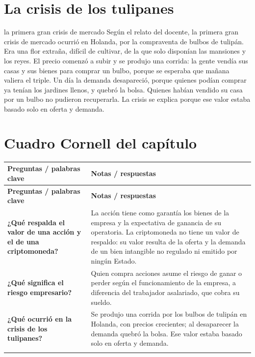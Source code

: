 \documentclass[12pt,oneside]{book}
\makeatletter
\newenvironment{cornell}{%
    \begin{longtable}{@{}>{\raggedright\arraybackslash}p{0.28\textwidth}>{\raggedright\arraybackslash}p{0.67\textwidth}@{}}
    \toprule
    \textbf{Preguntas / palabras clave} & \textbf{Notas / respuestas} \\
    \midrule
    \endfirsthead
    \toprule
    \textbf{Preguntas / palabras clave} & \textbf{Notas / respuestas} \\
    \midrule
    \endhead
}{%
    \end{longtable}
}
\newcommand{\cornellrow}[2]{\textbf{#1} & #2 \\[0.6em]}
\newcommand{\cornellresumen}[1]{%
    \midrule
    \multicolumn{2}{@{}p{\dimexpr0.95\textwidth+2\tabcolsep\relax}@{}}{\textbf{Resumen:} #1} \\
    \bottomrule
}
\makeatother
\begin{document}
\section{La crisis de los tulipanes}

\begin{example}{la primera gran crisis de mercado}
Según el relato del docente, la primera gran crisis de mercado ocurrió en Holanda, por la compraventa de bulbos de tulipán. Era una flor extraña, difícil de cultivar, de la que solo disponían las mansiones y los reyes. El precio comenzó a subir y se produjo una corrida: la gente vendía sus casas y sus bienes para comprar un bulbo, porque se esperaba que mañana valiera el triple. Un día la demanda desapareció, porque quienes podían comprar ya tenían los jardines llenos, y quebró la bolsa. Quienes habían vendido su casa por un bulbo no pudieron recuperarla. La crisis se explica porque ese valor estaba basado solo en oferta y demanda.
\end{example}

\section{Cuadro Cornell del capítulo}

\begin{cornell}
\cornellrow{¿Qué respalda el valor de una acción y el de una criptomoneda?}{La acción tiene como garantía los bienes de la empresa y la expectativa de ganancia de su operatoria. La criptomoneda no tiene un valor de respaldo: su valor resulta de la oferta y la demanda de un bien intangible no regulado ni emitido por ningún Estado.}
\cornellrow{¿Qué significa el riesgo empresario?}{Quien compra acciones asume el riesgo de ganar o perder según el funcionamiento de la empresa, a diferencia del trabajador asalariado, que cobra su sueldo.}
\cornellrow{¿Qué ocurrió en la crisis de los tulipanes?}{Se produjo una corrida por los bulbos de tulipán en Holanda, con precios crecientes; al desaparecer la demanda quebró la bolsa. Ese valor estaba basado solo en oferta y demanda.}
\cornellresumen{La digresión muestra que el valor basado solo en oferta y demanda, sin respaldo, es frágil (crisis de los tulipanes), y que el empresario asume el riesgo de ganar o perder, a diferencia del trabajador asalariado.}
\end{cornell}
\end{document}
